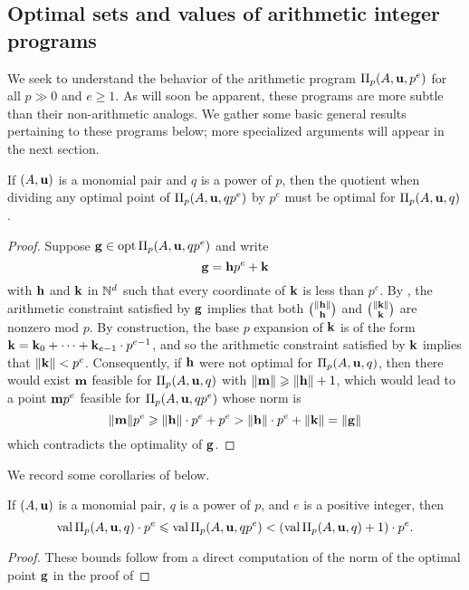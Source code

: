 \documentclass[11pt]{amsart}
\begin{document}
\subsection{Optimal sets and values of arithmetic integer programs}

We seek to understand the behavior of the arithmetic program $\Pi_p(A, \mathbf{u}, p^e)$ for all $p \gg 0$ and $e \geq 1$.
As will soon be apparent, these programs are more subtle than their non-arithmetic analogs.
We gather some basic general results pertaining to these programs below;  more specialized arguments will appear in the next section.

\begin{lemma} 
   \label{optimal division: L}
   If $(A, \mathbf{u})$ is a monomial pair and $q$ is a power of $p$, then the quotient when dividing any optimal point of $\Pi_p(A, \mathbf{u}, qp^e)$ by $p^e$ must be optimal for $\Pi_p(A, \mathbf{u}, q)$.
\end{lemma}

\begin{proof}  Suppose $\mathbf{g} \in \operatorname{opt} \Pi_p(A, \mathbf{u}, qp^e)$ and write 
\[ \mathbf{g} = \mathbf{h} p^e + \mathbf{k} \]
with $\mathbf{h}$ and $\mathbf{k}$ in $\mathbb{N}^d$ such that every coordinate of $\mathbf{k}$ is less than $p^e$.
By , the arithmetic constraint satisfied by $\mathbf{g}$ implies that both $\binom{\| \mathbf{h} \|}{\mathbf{h}}$ and $\binom{\| \mathbf{k} \|}{\mathbf{k}}$ are nonzero mod $p$.
By construction,  the base $p$ expansion of $\mathbf{k}$ is of the form $\mathbf{k} = \mathbf{k}_0 + \cdots + \mathbf{k}_{e-1} \cdot p^{e-1}$, and so the arithmetic constraint satisfied by $\mathbf{k}$ implies that $\| \mathbf{k} \| < p^e$.
Consequently, if $\mathbf{h}$ were not optimal for $\Pi_p(A, \mathbf{u}, q)$, then there would exist $\mathbf{m}$ feasible for $\Pi_p(A, \mathbf{u}, q)$ with $\| \mathbf{m} \| \geqslant \| \mathbf{h} \| + 1$, which would lead to a point $\mathbf{m}p^e$ feasible for $\Pi_p(A, \mathbf{u}, qp^e)$ whose norm is \[ \| \mathbf{m} \|p^e \geqslant \| \mathbf{h} \| \cdot p^e + p^e >  \| \mathbf{h} \| \cdot p^e + \| \mathbf{k} \| = \| \mathbf{g} \|\] which contradicts the optimality of $\mathbf{g}$. %
\end{proof}

We record some corollaries of  below.


\begin{corollary}
   \label{natural bounds: C}
   If $(A, \mathbf{u})$ is a monomial pair, $q$ is a power of $p$, and $e$ is a positive integer, then
   \[ \operatorname{val} \Pi_p(A, \mathbf{u}, q) \cdot p^e \leqslant \operatorname{val} \Pi_p(A, \mathbf{u}, qp^e) < (\operatorname{val} \Pi_p(A, \mathbf{u}, q) +1) \cdot p^e. \]
\end{corollary}
\begin{proof}
These bounds follow from a direct computation of the norm of the optimal point $\mathbf{g}$ in the proof of 
\end{proof}
\end{document}
